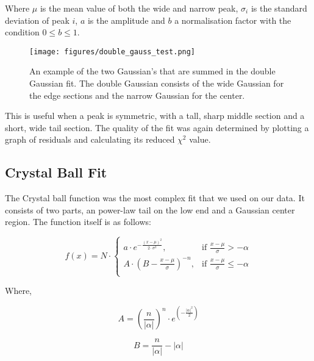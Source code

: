 \documentclass[A4sheet,12pt]{article}
\begin{document}
Where $\mu$ is the mean value of both the wide and narrow peak, $\sigma_i$ is the standard deviation of peak $i$, $a$ is the amplitude and $b$ a normalisation factor with the condition $0\leq b \leq 1$.\\



\begin{figure}[H]
\centering
\texttt{[image: figures/double\_gauss\_test.png]}
\caption{An example of the two Gaussian's that are summed in the double Gaussian fit. The double Gaussian consists of the wide Gaussian for the edge sections and the narrow Gaussian for the center.}
\label{fig:2d_hists_ex}
\end{figure}

This is useful when a peak is symmetric, with a tall, sharp middle section and a short, wide tail section. The quality of the fit was again determined by plotting a graph of residuals and calculating its 
reduced $\chi ^2$ value.

\subsection*{Crystal Ball Fit}

The Crystal ball function was the most complex fit that we used on our data. It consists of two parts, an power-law tail on the low end and a Gaussian center region. The function itself is as follows:

\begin{equation}
        f(x)= N\cdot  
\begin{cases}
    a\cdot e^{-\frac{(x-\mu)^2}{2\cdot \sigma^2}},& \text{if } \frac{x-\mu}{\sigma}> -\alpha\\
    A\cdot (B-\frac{x-\mu}{\sigma})^{-n},    & \text{if } \frac{x-\mu}{\sigma}\leq -\alpha\\
\end{cases}
\end{equation}

Where, 

\begin{equation*}
    A = \left(\frac{n}{\lvert \alpha \rvert}\right)^{n}\cdot e^{(-\frac{\lvert \alpha \rvert^2}{2})}
\end{equation*}

\begin{equation*}
    B = \frac{n}{\lvert \alpha \rvert} - \lvert \alpha \rvert
\end{equation*}
\end{document}
